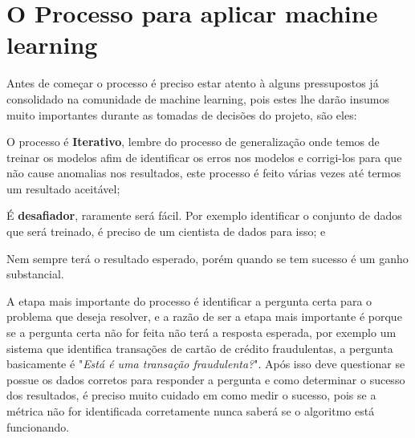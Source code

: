 \section{O Processo para aplicar machine learning}
\label{sec:howtoapplyml}

Antes de começar o processo é preciso estar atento à alguns pressupostos já consolidado na comunidade de machine learning, pois estes lhe darão insumos muito importantes durante 
as tomadas de decisões do projeto, são eles: 
\begin{alineas}
    \item O processo é \textbf{Iterativo}, lembre do processo de generalização onde temos de treinar os modelos afim de identificar os erros nos modelos e corrigi-los para que não cause
    anomalias nos resultados, este processo é feito várias vezes até termos um resultado aceitável;
    \item É  \textbf{desafiador}, raramente será fácil. Por exemplo identificar o conjunto de dados que será treinado, é preciso de um cientista de dados para isso; e 
    \item Nem sempre terá o resultado esperado, porém quando se tem sucesso é um ganho substancial.
\end{alineas}
  
A etapa mais importante do processo é identificar a pergunta certa para o problema que deseja resolver, e a razão de ser a etapa mais importante é 
porque se a pergunta certa não for feita não terá a resposta esperada, por exemplo um sistema que identifica transações de cartão de crédito fraudulentas, a 
pergunta basicamente é "\textit{Está é uma transação fraudulenta?}". Após isso deve questionar se possue os dados corretos para responder a pergunta e como determinar o sucesso dos resultados,
é preciso muito cuidado em como medir o sucesso, pois se a métrica não for identificada corretamente nunca saberá se o algoritmo está funcionando.


